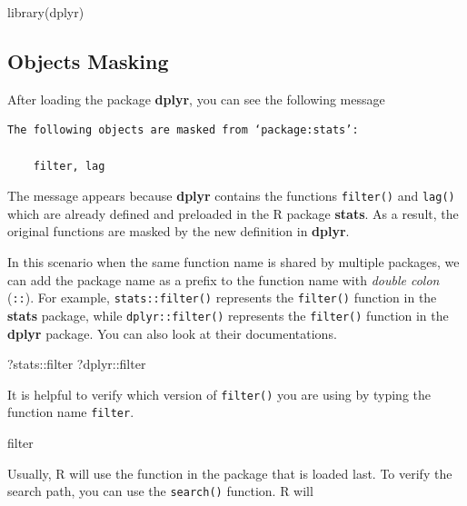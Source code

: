 \documentclass[
]{book}
\newenvironment{Shaded}{\begin{snugshade}}{\end{snugshade}}
\newcommand{\FunctionTok}[1]{\textcolor[rgb]{0.00,0.00,0.00}{#1}}
\newcommand{\NormalTok}[1]{#1}
\newcommand{\SpecialCharTok}[1]{\textcolor[rgb]{0.00,0.00,0.00}{#1}}
\begin{document}
\begin{Shaded}
\begin{Highlighting}[]
\FunctionTok{library}\NormalTok{(dplyr)}
\end{Highlighting}
\end{Shaded}

\hypertarget{objects-masking}{%
\subsection{Objects Masking}\label{objects-masking}}

After loading the package \textbf{dplyr}, you can see the following message

\begin{verbatim}
The following objects are masked from ‘package:stats’:

    filter, lag
\end{verbatim}

The message appears because \textbf{dplyr} contains the functions \texttt{filter()} and \texttt{lag()} which are already defined and preloaded in the R package \textbf{stats}. As a result, the original functions are masked by the new definition in \textbf{dplyr}.

In this scenario when the same function name is shared by multiple packages, we can add the package name as a prefix to the function name with \emph{double colon} (\texttt{::}). For example, \texttt{stats::filter()} represents the \texttt{filter()} function in the \textbf{stats} package, while \texttt{dplyr::filter()} represents the \texttt{filter()} function in the \textbf{dplyr} package. You can also look at their documentations.

\begin{Shaded}
\begin{Highlighting}[]
\NormalTok{?stats}\SpecialCharTok{::}\NormalTok{filter}
\NormalTok{?dplyr}\SpecialCharTok{::}\NormalTok{filter}
\end{Highlighting}
\end{Shaded}

It is helpful to verify which version of \texttt{filter()} you are using by typing the function name \texttt{filter}.

\begin{Shaded}
\begin{Highlighting}[]
\NormalTok{filter}
\end{Highlighting}
\end{Shaded}

Usually, R will use the function in the package that is loaded last. To verify the search path, you can use the \texttt{search()} function. R will
\end{document}
